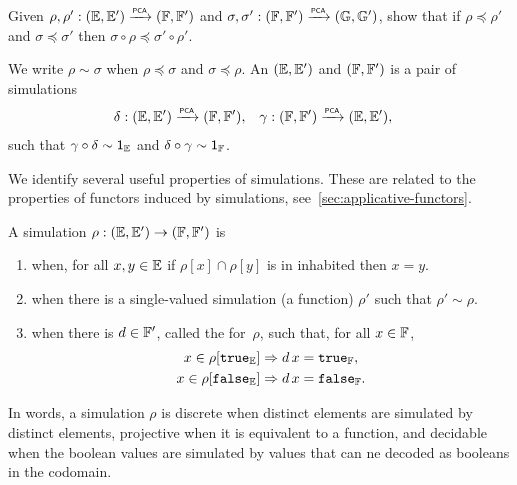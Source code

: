 \begin{exercise}
  Given $\rho, \rho' : ({\mathbb{E}}, {\mathbb{E}'}) \xrightarrow{\scriptscriptstyle\mathsf{PCA}}{} ({\mathbb{F}}, {\mathbb{F}'})$ and $\sigma, \sigma' : ({\mathbb{F}}, {\mathbb{F}'}) \xrightarrow{\scriptscriptstyle\mathsf{PCA}}{} ({\mathbb{G}}, {\mathbb{G}'})$, show that if $\rho \preceq \rho'$ and $\sigma \preceq \sigma'$ then $\sigma \circ \rho \preceq \sigma' \circ \rho'$.
\end{exercise}

We write $\rho \sim \sigma$ when $\rho \preceq \sigma$ and $\sigma \preceq \rho$. An 
$({\mathbb{E}}, {\mathbb{E}'})$ and $({\mathbb{F}}, {\mathbb{F}'})$ is a pair of simulations
%
\begin{align*}
  \delta &: ({\mathbb{E}}, {\mathbb{E}'}) \xrightarrow{\scriptscriptstyle\mathsf{PCA}}{} ({\mathbb{F}}, {\mathbb{F}'}),
  &
  \gamma &: ({\mathbb{F}}, {\mathbb{F}'}) \xrightarrow{\scriptscriptstyle\mathsf{PCA}}{} ({\mathbb{E}}, {\mathbb{E}'}),
\end{align*}
%
such that $\gamma \circ \delta \sim \mathsf{1}_{\mathbb{E}}$ and $\delta \circ \gamma
\sim \mathsf{1}_{\mathbb{F}}$.

We identify several useful properties of simulations. These are related to the properties of functors induced by simulations, see~\cref{sec:applicative-functors}.


\begin{definition}
  A simulation $\rho: ({\mathbb{E}}, {\mathbb{E}'}) \to ({\mathbb{F}}, {\mathbb{F}'})$ is
  \begin{enumerate}
  \item {} when, for all $x, y \in {\mathbb{E}}$ if $\rho[x] \cap \rho[y]$ is in inhabited then
    $x = y$.

  \item {} when there is a single-valued
    simulation (a function) $\rho'$ such that $\rho' \sim \rho$.

  \item {} when there is $d \in {\mathbb{F}'}$,
    called the
     for~$\rho$, such that, for all $x \in
    {\mathbb{F}}$,
    \begin{align*}
      x \in \rho[\mathtt{true}_{\mathbb{E}}] &\Rightarrow d \, x = \mathtt{true}_{\mathbb{F}},
      \\
      x \in \rho[\mathtt{false}_{\mathbb{E}}] &\Rightarrow d \, x = \mathtt{false}_{\mathbb{F}}.
    \end{align*}
  \end{enumerate}
\end{definition}

In words, a simulation $\rho$ is discrete when distinct elements are simulated by distinct elements, projective when it is equivalent to a function, and decidable when the boolean values are simulated by values that can ne decoded as booleans in the codomain.

